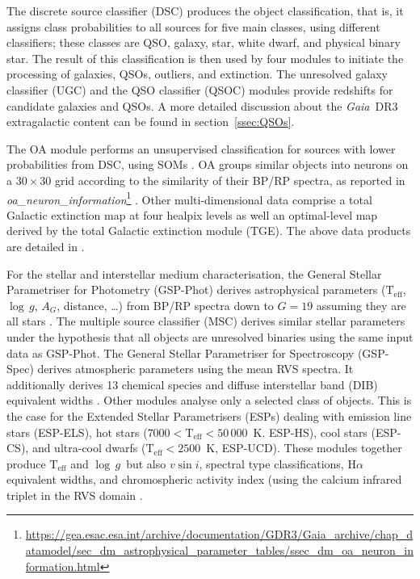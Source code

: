 \documentclass[longauth]{aa}
\makeatletter
\providecommand{\teff}{\ensuremath{{\mathrm{T_{eff}}}}\xspace}
\providecommand{\logg}{\ensuremath{\log\,g}\xspace}
\providecommand{\bprp}{BP/RP\xspace}
\providecommand{\ag}{\ensuremath{A_G}\xspace}
\providecommand{\modulename}[1]{#1\xspace}
\providecommand{\gspphot}{\modulename{GSP-Phot}}
\providecommand{\gspspec}{\modulename{GSP-Spec}}
\providecommand\gdrthree{\textit{Gaia}~DR3\xspace}
\providecommand{\linktodoc}{https://gea.esac.esa.int/archive/documentation/GDR3}
\providecommand{\linktotableap}[1]{\url{\linktodoc/Gaia_archive/chap_datamodel/sec_dm_astrophysical_parameter_tables/ssec_dm_#1.html}} %
\DeclareRobustCommand*{\fieldName}[1]{%
  \begingroup\@fieldName\scantokens{\texttt{\small {#1}}\noexpand}\endgroup}
\makeatother
\begin{document}
 The discrete source classifier (DSC)  produces the object classification, that is, it assigns class probabilities to all sources for five main classes, using different classifiers; these classes are QSO, galaxy, star, white dwarf, and physical binary star.  The result of this classification is then used by four modules to initiate the processing of galaxies, QSOs, outliers, and extinction. The unresolved  galaxy  classifier (UGC) and the QSO classifier (QSOC) modules \citep{DR3-DPACP-158} provide redshifts for candidate galaxies and QSOs. A more detailed discussion about the \gdrthree extragalactic content can be found in section~\ref{ssec:QSOs}. 

The   OA  module  performs  an  unsupervised classification for sources with lower probabilities from DSC, using SOMs \citep{kohonen_self-organizing_2001}. OA groups similar objects into neurons on a $30\times30$ grid according to the similarity of their \bprp spectra, as reported in \textit{oa\_neuron\_information}\footnote{\linktotableap{oa_neuron_information}} \citep[see][figure 11, for examples]{DR3-DPACP-157}. Other multi-dimensional data comprise a total Galactic extinction map at four healpix levels as well an optimal-level map derived by the total Galactic extinction module (TGE). The above data products are detailed in \cite{DR3-DPACP-158}. 

For the stellar and interstellar medium characterisation, the General Stellar Parametriser for Photometry (\gspphot) derives astrophysical parameters (\teff, \logg, \ag,  distance, \ldots) from \bprp spectra down to $G=19$ assuming they  are all stars \citep{DR3-DPACP-156}. The multiple source classifier (MSC) derives similar stellar parameters under the hypothesis that all objects are unresolved binaries using the same input data as \gspphot. 
The General Stellar Parametriser for Spectroscopy (\gspspec) derives atmospheric parameters using the mean RVS spectra.  It additionally derives 13 chemical species and diffuse interstellar band (DIB) equivalent widths  \citep[see][for details]{DR3-DPACP-186}. 
Other modules analyse only a selected class of objects. This is the case for  the Extended Stellar Parametrisers (ESPs) dealing with emission line stars (ESP-ELS), hot stars ($7000 < \teff<50\,000$~K. ESP-HS), cool stars (ESP-CS),  
and ultra-cool dwarfs ($\teff < 2500$~K, ESP-UCD). These modules together produce  \teff and \logg\ but also $v \sin i$, spectral type classifications, H$\alpha$ equivalent widths, and chromospheric activity index (using the calcium infrared triplet in the RVS domain \citep{DR3-DPACP-175}. 
\end{document}
